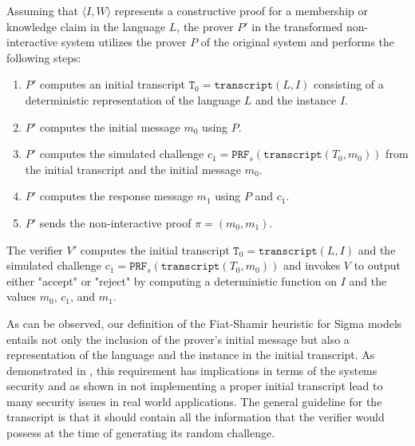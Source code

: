 Assuming that $\langle I, W\rangle$ represents a constructive proof for a membership or knowledge claim in the language $L$, the prover $P'$ in the transformed non-interactive system utilizes the prover $P$ of the original system and performs the following steps:
\begin{enumerate}
\label{def_sigma-model-fiat-shamir}
\item $P'$ computes an initial transcript $\mathtt{T}_0 = \mathtt{transcript}(L,I)$ consisting of a deterministic representation of the language $L$ and the instance $I$.
\item $P'$ computes the initial message $m_0$ using $P$.
\item $P'$ computes the simulated challenge $c_1=\mathtt{PRF}_s(\mathtt{transcript}(T_0,m_0))$ from the initial transcript and the initial message $m_0$.
\item $P'$ computes the response message $m_1$ using $P$ and $c_1$.
\item $P'$ sends the non-interactive proof $\pi=(m_0,m_1)$.
\end{enumerate}
The verifier $V'$ computes the initial transcript $\mathtt{T}_0 = \mathtt{transcript}(L,I)$ and the simulated challenge $c_1=\mathtt{PRF}_s(\mathtt{transcript}(T_0,m_0))$ and invokes $V$ to output either "accept" or "reject" by computing a deterministic function on $I$ and the values $m_0$, $c_1$, and $m_1$.

As can be observed, our definition of the Fiat-Shamir heuristic for Sigma models entails not only the inclusion of the prover's initial message but also a representation of the language and the instance in the initial transcript. As demonstrated in \cite{bernhard-16}, this requirement has implications in terms of the systems security and as shown in \cite{dao-23} not implementing a proper initial transcript lead to many security issues in real world applications. The general guideline for the transcript is that it should contain all the information that the verifier would possess at the time of generating its random challenge. 

